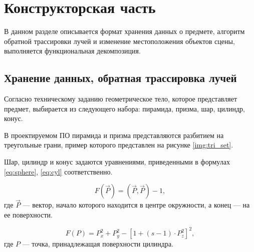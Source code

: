 \chapter{Конструкторская часть}

В данном разделе описывается формат хранения данных о предмете, алгоритм обратной трассировки лучей и изменение местоположения объектов сцены, выполняется функциональная декомпозиция.

\section{Хранение данных, обратная трассировка лучей}

Согласно техническому заданию геометрическое тело, которое представляет предмет, выбирается из следующего набора: пирамида, призма, шар, цилиндр, конус.

В проектируемом ПО пирамида и призма представляются разбитием на треугольные грани, пример которого представлен на рисунке \ref{img:tri_set}.


Шар, цилиндр и конус задаются уравнениями, приведенными в формулах \ref{eq:sphere}, \ref{eq:cyl} соответственно.

\begin{equation}\label{eq:sphere}
	F(\overrightarrow{P}) = (\overrightarrow{P}, \overrightarrow{P}) - 1,
\end{equation}
где $\overrightarrow{P}$ --- вектор, начало которого находится в центре окружности, а конец --- на ее поверхности.

\begin{equation}\label{eq:cyl}
	F(P) = P_x^2 + P_y^2 - [1 + (s - 1) \cdot P_z^2]^2,
\end{equation}
где $P$ --- точка, принадлежащая поверхности цилиндра.

\iffalse
В качестве хранения информации об объектах сцены используется формат данных STL, в котором поверхности модели объекта и их нормали описываются списком треугольных граней \cite{szilvsi2003analysis}.
Заранее созданные сторонними пакетами базовые модели объектов, хранящиеся в формате STL, загружаются в программу, обрабатываются и изменяются пользователем.
Пример разбития поверхности на треугольные грани приведен на рисунке \ref{img:stl_example}.

\includeimage{stl_example}{f}{h}{0.9\textwidth}{Разбитие поверхности на треугольные грани \cite{szilvsi2003analysis}}
\fi

